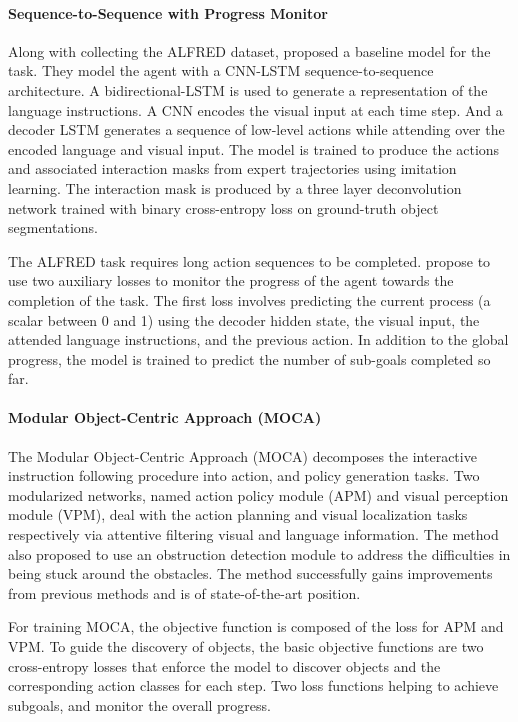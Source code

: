 \documentclass[11pt,a4paper]{article}
\begin{document}
\paragraph{Sequence-to-Sequence with Progress Monitor}
Along with collecting the ALFRED dataset, \citet{ALFRED20} proposed a baseline model for the task. They model the agent with a CNN-LSTM sequence-to-sequence architecture. A bidirectional-LSTM is used to generate a representation of the language instructions. A CNN encodes the visual input at each time step. And a decoder LSTM generates a sequence of low-level actions while attending over the encoded language and visual input. The model is trained to produce the actions and associated interaction masks from expert trajectories using imitation learning. The interaction mask is produced by a three layer deconvolution network trained with binary cross-entropy loss on ground-truth object segmentations.

The ALFRED task requires long action sequences to be completed. \citet{ALFRED20} propose to use two auxiliary losses to monitor the progress of the agent towards the completion of the task. The first loss involves predicting the current process (a scalar between 0 and 1) using the decoder hidden state, the visual input, the attended language instructions, and the previous action. In addition to the global progress, the model is trained to predict the number of sub-goals completed so far. 

\paragraph{Modular Object-Centric Approach (MOCA)}The Modular Object-Centric Approach (MOCA) \citep{singh2020moca} decomposes the interactive instruction following procedure into action, and policy generation tasks. Two modularized networks, named action policy module (APM) and visual perception module (VPM), deal with the action planning and visual localization tasks respectively via attentive filtering visual and language information. The method also proposed to use an obstruction detection module to address the difficulties in being stuck around the obstacles. The method successfully gains improvements from previous methods and is of state-of-the-art position.

For training MOCA, the objective function is composed of the loss for APM and VPM. To guide the discovery of objects, the basic objective functions are two cross-entropy losses that enforce the model to discover objects and the corresponding action classes for each step. Two loss functions helping to achieve subgoals, and monitor the overall progress.
\end{document}
